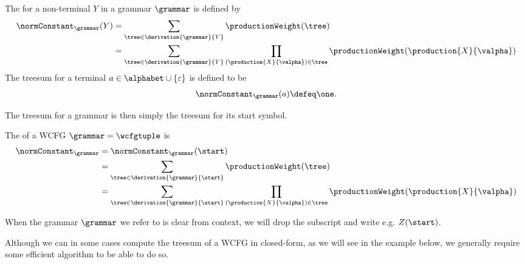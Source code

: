\begin{definition}[Treesum]
The  for a non-terminal $Y$ in a grammar $\grammar$ is defined by
\begin{align}
 \normConstant_{\grammar}(Y) &= \sum_{\tree\in\derivation{\grammar}{Y}} \productionWeight(\tree) \\
 &=\sum_{\tree\in\derivation{\grammar}{Y}}\prod_{(\production{X}{\valpha})\in\tree}\productionWeight(\production{X}{\valpha})
\end{align}
The treesum for a terminal $a\in\alphabet\cup\{\varepsilon\}$ is defined to be
\begin{equation}
    \normConstant_{\grammar}(a) \defeq \one.
\end{equation}
\label{def:treesum}
\end{definition}
The treesum for a grammar is then simply the treesum for its start symbol.
\begin{definition}
The  of a WCFG $\grammar=\wcfgtuple$ is
\begin{align}
    \normConstant_{\grammar} & =\normConstant_{\grammar}(\start)\\
    &= \sum_{\tree\in\derivation{\grammar}{\start}} \productionWeight(\tree) \\
    &=\sum_{\tree\in\derivation{\grammar}{\start}}\prod_{(\production{X}{\valpha})\in\tree}\productionWeight(\production{X}{\valpha})
\end{align}

\end{definition}

When the grammar $\grammar$ we refer to is clear from context, we will drop the subscript and write e.g. $Z(\start)$. 

Although we can in some cases compute the treesum of a WCFG in closed-form, as we will see in the example below, we generally require some efficient algorithm to be able to do so.

